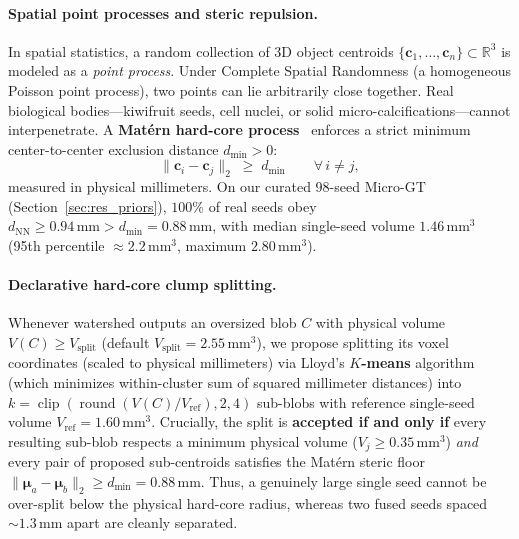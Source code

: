 \documentclass[10pt,a4paper]{article}
\renewcommand{\_}{\origunderscore\allowbreak}
\begin{document}
\paragraph{Spatial point processes and steric repulsion.} In spatial statistics, a random collection of 3D object centroids $\{\mathbf{c}_1, \dots, \mathbf{c}_n\} \subset \mathbb{R}^3$ is modeled as a \emph{point process}. Under Complete Spatial Randomness (a homogeneous Poisson point process), two points can lie arbitrarily close together. Real biological bodies---kiwifruit seeds, cell nuclei, or solid micro-calcifications---cannot interpenetrate. A \textbf{Mat\'ern hard-core process}~\cite{matern1986spatial} enforces a strict minimum center-to-center exclusion distance $d_{\min} > 0$:
\begin{equation}
    \|\mathbf{c}_i - \mathbf{c}_j\|_2 \;\ge\; d_{\min} \qquad \forall\, i \neq j,
\end{equation}
measured in physical millimeters. On our curated 98-seed Micro-GT (Section~\ref{sec:res_priors}), $100\%$ of real seeds obey $d_{\text{NN}} \ge 0.94\,\text{mm} > d_{\min} = 0.88\,\text{mm}$, with median single-seed volume $1.46\,\text{mm}^3$ (95th percentile $\approx 2.2\,\text{mm}^3$, maximum $2.80\,\text{mm}^3$).

\paragraph{Declarative hard-core clump splitting.} Whenever watershed outputs an oversized blob $C$ with physical volume $V(C) \ge V_{\text{split}}$ (default $V_{\text{split}} = 2.55\,\text{mm}^3$), we propose splitting its voxel coordinates (scaled to physical millimeters) via Lloyd's \textbf{$K$-means} algorithm (which minimizes within-cluster sum of squared millimeter distances) into $k = \operatorname{clip}(\operatorname{round}(V(C) / V_{\text{ref}}), 2, 4)$ sub-blobs with reference single-seed volume $V_{\text{ref}} = 1.60\,\text{mm}^3$. Crucially, the split is \textbf{accepted if and only if} every resulting sub-blob respects a minimum physical volume ($V_j \ge 0.35\,\text{mm}^3$) \emph{and} every pair of proposed sub-centroids satisfies the Mat\'ern steric floor $\|\boldsymbol{\mu}_a - \boldsymbol{\mu}_b\|_2 \ge d_{\min} = 0.88\,\text{mm}$. Thus, a genuinely large single seed cannot be over-split below the physical hard-core radius, whereas two fused seeds spaced $\sim 1.3\,\text{mm}$ apart are cleanly separated.

\clearpage
\end{document}
